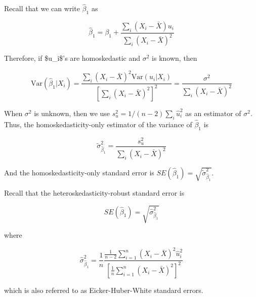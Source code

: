 \documentclass[a4paper,11pt]{article}
\newcommand{\var}{\mathrm{Var}}
\begin{document}
Recall that we can write \(\hat{\beta}_1\) as
\begin{LaTeX}
\begin{equation*}
\hat{\beta}_1 = \beta_1 + \frac{\sum_i (X_i - \bar{X})u_i}{\sum_i
(X_i - \bar{X})^2} 
\end{equation*} 
\end{LaTeX}

Therefore, if \$u\_i\$'s are
homoskedastic and \(\sigma^2\) is known, then
\begin{LaTeX}
\begin{equation}
\label{eq:vbeta-1a} \var(\hat{\beta}_1 | X_i) = \frac{\sum_i (X_i -
\bar{X})^2 \var(u_i|X_i)}{\left[\sum_i (X_i - \bar{X})^2\right]^2} =
\frac{\sigma^2}{\sum_i (X_i - \bar{X})^2} 
\end{equation} 
\end{LaTeX}

When \(\sigma^2\) is unknown, then we use \(s^2_u = 1/(n-2) \sum_i
\hat{u}_i^2\) as an estimator of \(\sigma^2\). Thus, the
homoskedasticity-only estimator of the variance of \(\hat{\beta}_1\) is
\begin{LaTeX}
\begin{equation}
\label{eq:vbeta-1b} \tilde{\sigma}^2_{\hat{\beta}_1} =
\frac{s^2_u}{\sum_i (X_i - \bar{X})^2} 
\end{equation} 
\end{LaTeX}

And the homoskedasticity-only standard error is \(SE(\hat{\beta}_1) =
\sqrt{\tilde{\sigma}^2_{\hat{\beta}_1}}\).

Recall that the heteroskedasticity-robust standard error is
\begin{LaTeX}
\begin{equation*}
SE(\hat{\beta}_1) = \sqrt{\hat{\sigma}^2_{\hat{\beta}_1}}
\end{equation*} 
\end{LaTeX}
where
\begin{LaTeX}
\begin{equation*}
\hat{\sigma}^2_{\hat{\beta}_1} = \frac{1}{n} \frac{\frac{1}{n-2}
\sum_{i=1}^n (X_i - \bar{X})^2 \hat{u}^2_i}{\left[ \frac{1}{n}
\sum_{i=1}^n (X_i - \bar{X})^2 \right]^2} 
\end{equation*} 
\end{LaTeX}
which is also referred to as Eicker-Huber-White standard errors.
\end{document}
